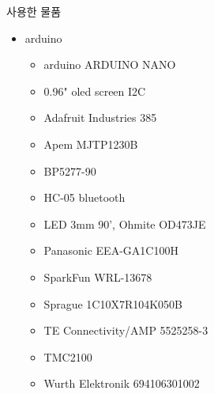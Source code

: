 \documentclass{gshs_poster_beamer}
\begin{document}
\begin{columns}[T]
\begin{posterbox}{사용한 물품}
\begin{itemize}
\begin{figure}[h]
		\caption{사용한 천체망원경}
		\label{fig:telescope}
	\end{figure}
		\item arduino
		\begin{itemize}
			\item arduino ARDUINO NANO
			\item 0.96" oled screen I2C
			\item Adafruit Industries 385
			\item Apem MJTP1230B
			\item BP5277-90
			\item HC-05 bluetooth
			\item LED 3mm 90', Ohmite OD473JE
			\item Panasonic EEA-GA1C100H
			\item SparkFun WRL-13678
			\item Sprague 1C10X7R104K050B
			\item TE Connectivity/AMP 5525258-3
			\item TMC2100
			\item Wurth Elektronik 694106301002
		\end{itemize}
	\end{itemize}
	

\end{posterbox}
\end{columns}
\end{document}
